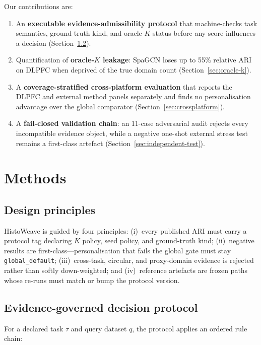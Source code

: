 \documentclass[]{bioinfo}
\begin{document}
Our contributions are:
\begin{enumerate}
  \item An \textbf{executable evidence-admissibility protocol} that
        machine-checks task semantics, ground-truth kind, and oracle-\(K\)
        status before any score influences a decision (Section~\ref{sec:protocol}).
  \item Quantification of \textbf{oracle-\(K\) leakage}: SpaGCN loses up
        to 55\% relative ARI on DLPFC when deprived of the true domain
        count (Section~\ref{sec:oracle-k}).
  \item A \textbf{coverage-stratified cross-platform evaluation} that
        reports the DLPFC and external method panels separately and finds
        no personalisation advantage over the global comparator
        (Section~\ref{sec:crossplatform}).
  \item A \textbf{fail-closed validation chain}: an 11-case adversarial
        audit rejects every incompatible evidence object, while a negative
        one-shot external stress test remains a first-class artefact
        (Section~\ref{sec:independent-test}).
\end{enumerate}

\section{Methods}

\subsection{Design principles}

HistoWeave is guided by four principles: (i)~every published ARI must
carry a protocol tag declaring \(K\) policy, seed policy, and
ground-truth kind; (ii)~negative results are first-class---personalisation
that fails the global gate must stay \texttt{global\_default};
(iii)~cross-task, circular, and proxy-domain evidence is rejected rather
than softly down-weighted; and (iv)~reference artefacts are frozen paths
whose re-runs must match or bump the protocol version.

\subsection{Evidence-governed decision protocol}
\label{sec:protocol}

For a declared task \(\tau\) and query dataset \(q\), the protocol
applies an ordered rule chain:
\end{document}

